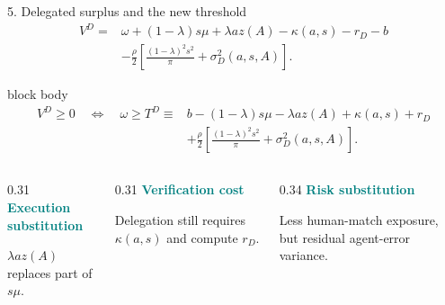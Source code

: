\documentclass[aspectratio=169,10pt]{beamer}
\newcommand{\strong}[1]{\textcolor{Teal}{\textbf{#1}}}
\begin{document}
\begin{frame}{5. Delegated surplus and the new threshold}
  \small
  \begin{align*}
    V^D
    ={}& \omega+(1-\lambda)s\mu+\lambda a z(A)-\kappa(a,s)-r_D-b\\[-0.05cm]
       &-\frac{\rho}{2}
        \left[
          \frac{(1-\lambda)^2s^2}{\pi}
          +\sigma_D^2(a,s,A)
        \right].
  \end{align*}

  \vspace{-0.10cm}
  \begin{beamercolorbox}[wd=\textwidth,sep=0.15cm,rounded=true]{block body}
    \begin{align*}
      V^D\ge0
      \quad\Longleftrightarrow\quad
      \omega\ge T^D\equiv{}&
      b-(1-\lambda)s\mu-\lambda a z(A)+\kappa(a,s)+r_D\\[-0.04cm]
      &+\frac{\rho}{2}
      \left[
        \frac{(1-\lambda)^2s^2}{\pi}
        +\sigma_D^2(a,s,A)
      \right].
    \end{align*}
  \end{beamercolorbox}

  \vspace{0.20cm}
  \begin{columns}[T,onlytextwidth]
    \begin{column}{0.31\textwidth}
      \strong{Execution substitution}\par
      \scriptsize $\lambda az(A)$ replaces part of $s\mu$.
    \end{column}
    \begin{column}{0.31\textwidth}
      \strong{Verification cost}\par
      \scriptsize Delegation still requires $\kappa(a,s)$ and compute $r_D$.
    \end{column}
    \begin{column}{0.34\textwidth}
      \strong{Risk substitution}\par
      \scriptsize Less human-match exposure, but residual agent-error variance.
    \end{column}
  \end{columns}
\end{frame}
\end{document}
